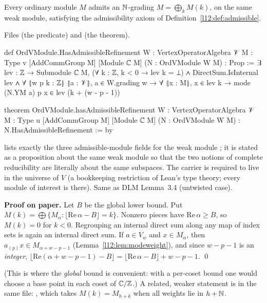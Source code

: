 \begin{theorem}[Ordinary $\subseteq$ admissible; Dong--Li--Mason, Lemma~3.4 at $g=1$]\label{l12:thm:ordadm}
Every ordinary module $M$ admits an ${\mathbb{N}}$-grading $M = \bigoplus_kM(k)$, on the same weak module,
satisfying the admissibility axiom of Definition~\ref{l12:def:admissible}.
\end{theorem}
\noindent Files  (the predicate) and
 (the theorem).
\begin{leancode}
def OrdVModule.HasAdmissibleRefinement {W : VertexOperatorAlgebra 𝒱} {M : Type v}
    [AddCommGroup M] [Module ℂ M] (N : OrdVModule W M) : Prop :=
  ∃ lev : ℤ → Submodule ℂ M,
    (∀ k : ℤ, k < 0 → lev k = ⊥) ∧ DirectSum.IsInternal lev ∧
      ∀ ⦃w p k : ℤ⦄ ⦃a : 𝒱⦄, a ∈ W.grading w → ∀ ⦃x : M⦄, x ∈ lev k →
        mode (N.YM a) p x ∈ lev (k + (w - p - 1))

theorem OrdVModule.hasAdmissibleRefinement {W : VertexOperatorAlgebra 𝒱} {M : Type u}
    [AddCommGroup M] [Module ℂ M] (N : OrdVModule W M) : N.HasAdmissibleRefinement := by
\end{leancode}

\begin{dictionary}
 lists exactly the three admissible-module fields for the weak module
; it is stated as a proposition about the same weak module so that the two notions of
complete reducibility are literally about the same subspaces. The carrier is required to live in the
universe  of $V$ (a bookkeeping restriction of Lean's type theory; every module of interest is
there). Same as DLM Lemma~3.4 (untwisted case).
\end{dictionary}

\textbf{Proof on paper.} Let $B$ be the global lower bound. Put $M(k) = \bigoplus\{M_\alpha :
\lfloor\mathrm{Re}\,\alpha - B\rfloor = k\}$. Nonzero pieces have $\mathrm{Re}\,\alpha\ge B$, so $M(k) = 0$ for
$k<0$. Regrouping an internal direct sum along any map of index sets is again an internal direct sum. If
$a\in V_w$ and $x\in M_\alpha$, then $a_{(p)}x\in M_{\alpha+w-p-1}$ (Lemma~\ref{l12:lem:modeweight}), and since
$w-p-1$ is an \emph{integer}, $\lfloor\mathrm{Re}(\alpha+w-p-1)-B\rfloor = \lfloor\mathrm{Re}\,\alpha-B\rfloor
+ w-p-1$. \qed

(This is where the \emph{global} bound is convenient: with a per-coset bound one would choose a base point
in each coset of ${\mathbb{C}}/{\mathbb{Z}}$.) A related, weaker statement is in the same file:
\allowbreak{}\allowbreak{}\allowbreak{}, which takes $M(k) = M_{h+k}$ when all weights
lie in $h+{\mathbb{N}}$.

